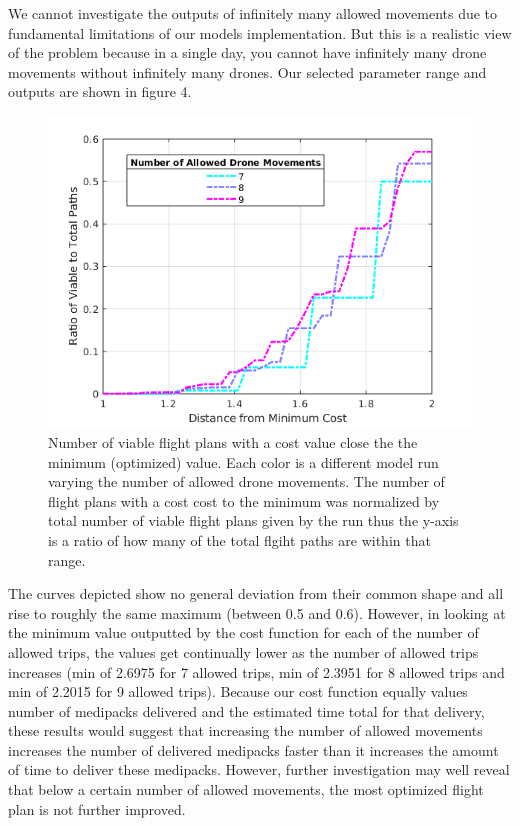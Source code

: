 \documentclass[twocolumn,10pt]{asme2ej}
\begin{document}
We cannot investigate the outputs of infinitely many allowed movements due to fundamental limitations of our models implementation. But this is a realistic view of the problem because in a single day, you cannot have infinitely many drone movements without infinitely many drones. Our selected parameter range and outputs are shown in figure 4.
\begin{figure}
	\centering
	\includegraphics[width=0.9\linewidth]{../cobt2d}
	\caption[Fig 3]{Number of viable flight plans with a cost value close the the minimum (optimized) value. Each color is a different model run varying the number of allowed drone movements. The number of flight plans with a cost cost to the minimum was normalized by total number of viable flight plans given by the run thus the y-axis is a ratio of how many of the total flgiht paths are within that range.}
	\label{Fig 4}
\end{figure}

The curves depicted show no general deviation from their common shape and all rise to roughly the same maximum (between 0.5 and 0.6). However, in looking at the minimum value outputted by the cost function for each of the number of allowed trips, the values get continually lower as the number of allowed trips increases (min of 2.6975 for 7 allowed trips, min of 2.3951 for 8 allowed trips and min of 2.2015 for 9 allowed trips). Because our cost function equally values number of medipacks delivered and the estimated time total for that delivery, these results would suggest that increasing the number of allowed movements increases the number of delivered medipacks faster than it increases the amount of time to deliver these medipacks. However, further investigation may well reveal that below a certain number of allowed movements, the most optimized flight plan is not further improved. 
\end{document}

